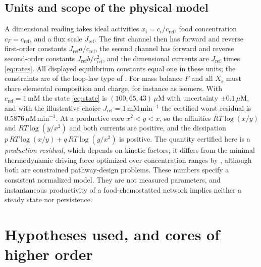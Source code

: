 \documentclass[11pt,a4paper]{article}
\theoremstyle{plain}
\theoremstyle{definition}
\theoremstyle{remark}
\begin{document}
\subsection{Units and scope of the physical model}\label{sec:units}
A dimensional reading takes ideal activities $x_i=c_i/c_{\mathrm{ref}}$, food concentration $c_F=c_{\mathrm{ref}}$, and a flux scale $J_{\mathrm{ref}}$. The first channel then has forward and reverse first-order constants $J_{\mathrm{ref}}a/c_{\mathrm{ref}}$, the second channel has forward and reverse second-order constants $J_{\mathrm{ref}}b/c_{\mathrm{ref}}^2$, and the dimensional currents are $J_{\mathrm{ref}}$ times \eqref{eq:rates}. All displayed equilibrium constants equal one in these units; the constraints are of the loop-law type of \citet{beard2004}. For mass balance $F$ and all $X_s$ must share elemental composition and charge, for instance as isomers. With $c_{\mathrm{ref}}=1\,\mathrm{mM}$ the state \eqref{eq:state} is $(100,65,43)\,\mu\mathrm{M}$ with uncertainty $\pm0.1\,\mu\mathrm{M}$, and with the illustrative choice $J_{\mathrm{ref}}=1\,\mathrm{mM\,min^{-1}}$ the certified worst residual is $0.5876\,\mu\mathrm{M\,min^{-1}}$. At a productive core $x^2<y<x$, so the affinities $RT\log(x/y)$ and $RT\log(y/x^2)$ and both currents are positive, and the dissipation $p\,RT\log(x/y)+q\,RT\log(y/x^2)$ is positive. The quantity certified here is a \emph{production residual}, which depends on kinetic factors; it differs from the minimal thermodynamic driving force optimized over concentration ranges by \citet{noor2014}, although both are constrained pathway-design problems. These numbers specify a consistent normalized model. They are not measured parameters, and instantaneous productivity of a food-chemostatted network implies neither a steady state nor persistence.

\section{Hypotheses used, and cores of higher order}\label{sec:extensions}
\end{document}
